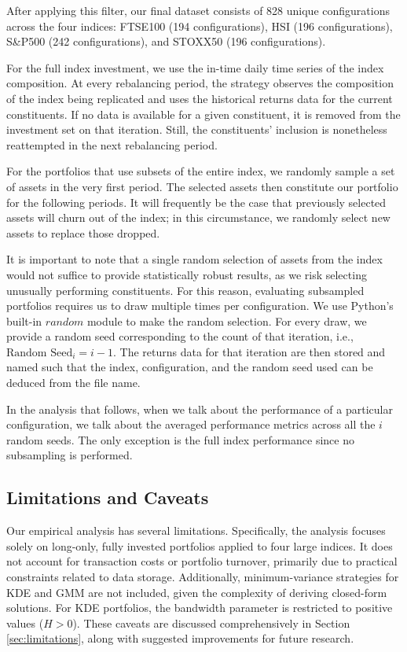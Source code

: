 After applying this filter, our final dataset consists of 828 unique configurations across the four indices: FTSE100 (194 configurations), HSI (196 configurations), S\&P500 (242 configurations), and STOXX50 (196 configurations).

For the full index investment, we use the in-time daily time series of the index composition. At every rebalancing period, the strategy observes the composition of the index being replicated and uses the historical returns data for the current constituents. If no data is available for a given constituent, it is removed from the investment set on that iteration. Still, the constituents' inclusion is nonetheless reattempted in the next rebalancing period. 

For the portfolios that use subsets of the entire index, we randomly sample a set of assets in the very first period. The selected assets then constitute our portfolio for the following periods. It will frequently be the case that previously selected assets will churn out of the index; in this circumstance, we randomly select new assets to replace those dropped. 

It is important to note that a single random selection of assets from the index would not suffice to provide statistically robust results, as we risk selecting unusually performing constituents. For this reason, evaluating subsampled portfolios requires us to draw multiple times per configuration. We use Python's built-in $\textit{random}$ module to make the random selection. For every draw, we provide a random seed corresponding to the count of that iteration, i.e., $\text{Random Seed}_i = i-1$. The returns data for that iteration are then stored and named such that the index, configuration, and the random seed used can be deduced from the file name.

In the analysis that follows, when we talk about the performance of a particular configuration, we talk about the averaged performance metrics across all the $i$ random seeds. The only exception is the full index performance since no subsampling is performed.

\subsection{Limitations and Caveats}
\label{sec:introlimitations}
Our empirical analysis has several limitations. Specifically, the analysis focuses solely on long-only, fully invested portfolios applied to four large indices. It does not account for transaction costs or portfolio turnover, primarily due to practical constraints related to data storage. Additionally, minimum-variance strategies for KDE and GMM are not included, given the complexity of deriving closed-form solutions. For KDE portfolios, the bandwidth parameter is restricted to positive values ($H>0$). These caveats are discussed comprehensively in Section \ref{sec:limitations}, along with suggested improvements for future research.


